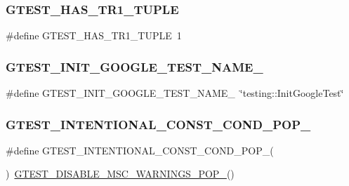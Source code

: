 \subsubsection{\texorpdfstring{GTEST\_HAS\_TR1\_TUPLE}{GTEST\_HAS\_TR1\_TUPLE}}
{\footnotesize\ttfamily \#define G\+T\+E\+S\+T\+\_\+\+H\+A\+S\+\_\+\+T\+R1\+\_\+\+T\+U\+P\+LE~1}

\mbox{\label{_obj__test_2lib_2googletest-release-1_88_81_2googletest_2include_2gtest_2internal_2gtest-port_8h_aa5e27ad4f88278501ef71bd9ddbb44c6}} 
\subsubsection{\texorpdfstring{GTEST\_INIT\_GOOGLE\_TEST\_NAME\_}{GTEST\_INIT\_GOOGLE\_TEST\_NAME\_}}
{\footnotesize\ttfamily \#define G\+T\+E\+S\+T\+\_\+\+I\+N\+I\+T\+\_\+\+G\+O\+O\+G\+L\+E\+\_\+\+T\+E\+S\+T\+\_\+\+N\+A\+M\+E\+\_\+~\char`\"{}testing\+::\+Init\+Google\+Test\char`\"{}}

\mbox{\label{_obj__test_2lib_2googletest-release-1_88_81_2googletest_2include_2gtest_2internal_2gtest-port_8h_ad115e2c466f7e8a32f1cf23ef2e5f220}} 
\subsubsection{\texorpdfstring{GTEST\_INTENTIONAL\_CONST\_COND\_POP\_}{GTEST\_INTENTIONAL\_CONST\_COND\_POP\_}}
{\footnotesize\ttfamily \#define G\+T\+E\+S\+T\+\_\+\+I\+N\+T\+E\+N\+T\+I\+O\+N\+A\+L\+\_\+\+C\+O\+N\+S\+T\+\_\+\+C\+O\+N\+D\+\_\+\+P\+O\+P\+\_\+(\begin{DoxyParamCaption}{ }\end{DoxyParamCaption})~\mbox{\hyperlink{_obj__test_2lib_2googletest-release-1_88_81_2googletest_2include_2gtest_2internal_2gtest-port_8h_ab4c44546d6d9aced68993b87b608fc06}{G\+T\+E\+S\+T\+\_\+\+D\+I\+S\+A\+B\+L\+E\+\_\+\+M\+S\+C\+\_\+\+W\+A\+R\+N\+I\+N\+G\+S\+\_\+\+P\+O\+P\+\_\+}}()}

